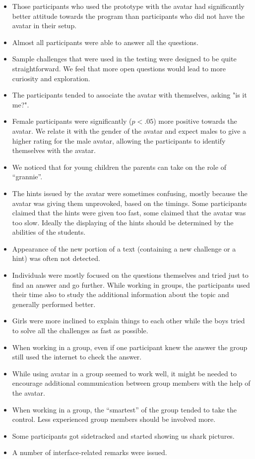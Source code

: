 \documentclass[a4paper]{article}
\begin{document}
\begin{itemize}
	\item Those participants who used the prototype with the avatar had significantly better attitude towards the program than participants who did not have the avatar in their setup.
	\item Almost all participants were able to answer all the questions. 
	\item Sample challenges that were used in the testing were designed to be quite straightforward. We feel that more open questions would lead to more curiosity and exploration. 
	\item The participants tended to associate the avatar with themselves, asking "is it me?".
	\item Female participants were significantly ($p < .05$) more positive towards the avatar. We relate it with the gender of the avatar and expect males to give a higher rating for the male avatar, allowing the participants to identify themselves with the avatar.
	\item We noticed that for young children the parents can take on the role of “grannie”.
	\item The hints issued by the avatar were sometimes confusing, mostly because the avatar was giving them unprovoked, based on the timings. Some participants claimed that the hints were given too fast, some claimed that the avatar was too slow. Ideally the displaying of the hints should be determined by the abilities of the students.
	\item Appearance of the new portion of a text (containing a new challenge or a hint) was often not detected.
	\item Individuals were mostly focused on the questions themselves and tried just to find an answer and go further. While working in groups, the participants used their time also to study the additional information about the topic and generally performed better.
	\item Girls were more inclined to explain things to each other while the boys tried to solve all the challenges as fast as possible.
	\item When working in a group, even if one participant knew the answer the group still used the internet to check the answer.
	\item While using avatar in a group seemed to work well, it might be needed to encourage additional communication between group members with the help of the avatar.
	\item When working in a group, the “smartest” of the group tended to take the control. Less experienced group members should be involved more.
	\item Some participants got sidetracked and started showing us shark pictures.
	\item A number of interface-related remarks were issued. 
\end{itemize}
\end{document}
